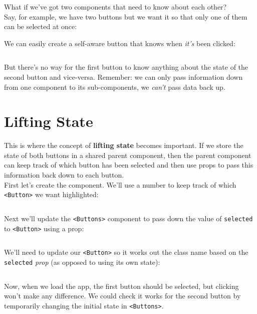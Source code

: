 What if we've got two components that need to know about each other?
\\

Say, for example, we have two buttons but we want it so that only one of them can be selected at once:


We can easily create a self-aware button that knows when \textit{it's} been clicked:

\inputminted{jsx}{03/figures/02/01-Button.jsx}

But there's no way for the first button to know anything about the state of the second button and vice-versa. Remember: we can only pass information down from one component to its sub-components, we \textit{can't} pass data back up.


\pagebreak


\section{Lifting State}

This is where the concept of \textbf{lifting state} becomes important. If we store the state of both buttons in a shared parent component, then the parent component can keep track of which button has been selected and then use props to pass this information back down to each button.
\\

First let's create the component. We'll use a number to keep track of which \texttt{<Button>} we want highlighted:

\inputminted{jsx}{03/figures/02/02-Buttons.jsx}


\pagebreak


Next we'll update the \texttt{<Buttons>} component to pass down the value of \texttt{selected} to \texttt{<Button>} using a prop:

\inputminted{jsx}{03/figures/02/03-Buttons-selected.jsx}

We'll need to update our \texttt{<Button>} so it works out the class name based on the \texttt{selected} \textit{prop} (as opposed to using its own state):

\inputminted{jsx}{03/figures/02/04-Button-selected.jsx}

Now, when we load the app, the first button should be selected, but clicking won't make any difference.  We could check it works for the second button by temporarily changing the initial state in \texttt{<Buttons>}.
\\

